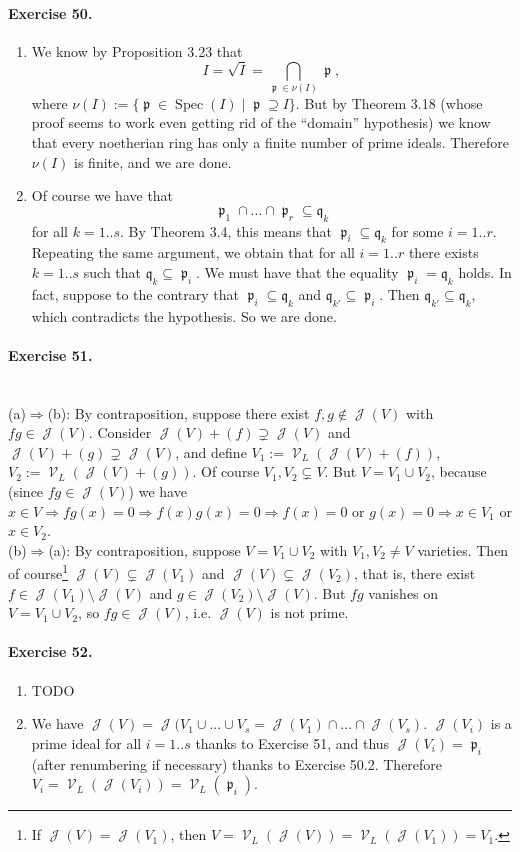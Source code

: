 \documentclass[12pt,a4paper]{report}
\theoremstyle{definition}
\theoremstyle{num.custom-title}
\DeclareMathOperator{\J}{\mathcal{J}}
\DeclareMathOperator{\p}{\mathfrak{p}}
\DeclareMathOperator{\V}{\mathcal{V}}
\DeclareMathOperator{\imp}{\Rightarrow}
\DeclareMathOperator{\sm}{\setminus}
\DeclareMathOperator{\sse}{\subseteq}
\DeclareMathOperator{\Spec}{Spec}
\begin{document}
\paragraph{Exercise 50.} 
\begin{enumerate}
\item We know by Proposition 3.23 that
\[
I=\sqrt{I}= \bigcap_{\p \in \nu(I)} \p,
\]
where $\nu(I):=\{\p \in \Spec(I) \mid \p \supseteq I\}$. But by Theorem 3.18 (whose proof seems to work even getting rid of the ``domain'' hypothesis) we know that every noetherian ring has only a finite number of prime ideals. Therefore $\nu(I)$ is finite, and we are done.
\item Of course we have that 
\[
\p_1 \cap ... \cap \p_r \sse \mathfrak{q}_k
\]
for all $k=1..s$. By Theorem 3.4, this means that $\p_i \sse \mathfrak{q}_k$ for some $i=1..r$. Repeating the same argument, we obtain that for all $i=1..r$ there exists $k=1..s$ such that $\mathfrak{q}_k \sse \p_i$. We must have that the equality $\p_i=\mathfrak{q}_k$ holds. In fact, suppose to the contrary that $\p_i \sse \mathfrak{q}_k$ and $\mathfrak{q}_{k'} \sse \p_i$. Then $\mathfrak{q}_{k'} \sse \mathfrak{q}_k$, which contradicts the hypothesis. So we are done.
\end{enumerate}

\paragraph{Exercise 51.}\ \\
(a)$\imp$(b): By contraposition, suppose there exist $f,g \not\in \J(V)$ with $fg \in \J(V)$. Consider $\J(V)+(f) \supsetneq \J(V)$ and $\J(V)+(g) \supsetneq \J(V)$, and define $V_1:=\V_L(\J(V)+(f))$, $V_2:=\V_L(\J(V)+(g))$. Of course $V_1,V_2 \subsetneq V$. But $V=V_1 \cup V_2$, because (since $fg \in \J(V)$) we have $x \in V \imp fg(x)=0 \imp f(x)g(x)=0 \imp f(x)=0$ or $g(x)=0 \imp x \in V_1$ or $x \in V_2$.\\
(b)$\imp$(a): By contraposition, suppose $V=V_1 \cup V_2$ with $V_1,V_2 \neq V$ varieties. Then of course\footnote{If $\J(V)=\J(V_1)$, then $V=\V_L(\J(V))=\V_L(\J(V_1))=V_1$.} $\J(V) \subsetneq \J(V_1)$ and $\J(V) \subsetneq \J(V_2)$, that is, there exist $f \in \J(V_1) \sm \J(V)$ and $g \in \J(V_2) \sm \J(V)$. But $fg$ vanishes on $V=V_1 \cup V_2$, so $fg \in \J(V)$, i.e. $\J(V)$ is not prime.




\paragraph{Exercise 52.} 
\begin{enumerate}
\item TODO
\item We have $\J(V)=\J(V_1 \cup ... \cup V_s=\J(V_1) \cap ... \cap \J(V_s)$. $\J(V_i)$ is a prime ideal for all $i=1..s$ thanks to Exercise 51, and thus $\J(V_i)=\p_i$ (after renumbering if necessary) thanks to Exercise 50.2. Therefore $V_i=\V_L(\J(V_i))=\V_L(\p_i)$.
\end{enumerate}
\end{document}
